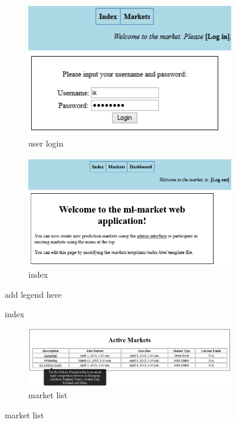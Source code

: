 \documentclass[bsc,frontabs,twoside,singlespacing,parskip,deptreport]{infthesis}     %
\begin{document}
\begin{itemize}
\begin{figure}
\begin{subfigure}{.5\textwidth}
  \includegraphics[width=.95\linewidth]{figures/ui-user-login(c).png}
  \caption{user login}
  \label{fig:ui-user-login}
\end{subfigure}%
\begin{subfigure}{.6\textwidth}

  \includegraphics[width=1\linewidth]{figures/ui-index(1).png}
  \caption{index}
  \label{fig:ui-index}
\end{subfigure}
\label{fig:ui-login-index}
{add legend here}
\end{figure}

\begin{figure}
\caption{Market list and market index}

\begin{subfigure}{1\textwidth}

  \includegraphics[width=1\linewidth]{figures/ui-market-list(c).png}
  \caption{market list}
  \label{fig:ui-market-list}
\end{subfigure}%


\end{figure}
\end{itemize}
\end{document}
